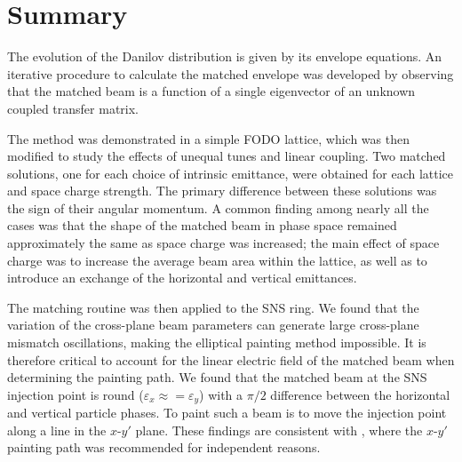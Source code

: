 \section{Summary}

The evolution of the Danilov distribution is given by its envelope equations. An iterative procedure to calculate the matched envelope was developed by observing that the matched beam is a function of a single eigenvector of an unknown coupled transfer matrix. 

The method was demonstrated in a simple FODO lattice, which was then modified to study the effects of unequal tunes and linear coupling. Two matched solutions, one for each choice of intrinsic emittance, were obtained for each lattice and space charge strength. The primary difference between these solutions was the sign of their angular momentum. A common finding among nearly all the cases was that the shape of the matched beam in phase space remained approximately the same as space charge was increased; the main effect of space charge was to increase the average beam area within the lattice, as well as to introduce an exchange of the horizontal and vertical emittances.

The matching routine was then applied to the SNS ring. We found that the variation of the cross-plane beam parameters can generate large cross-plane mismatch oscillations, making the elliptical painting method impossible. It is therefore critical to account for the linear electric field of the matched beam when determining the painting path. We found that the matched beam at the SNS injection point is round ($\varepsilon_x \approx = \varepsilon_y$) with a $\pi / 2$ difference between the horizontal and vertical particle phases. To paint such a beam is to move the injection point along a line in the $x$-$y'$ plane. These findings are consistent with \cite{Holmes2018}, where the $x$-$y'$ painting path was recommended for independent reasons. 